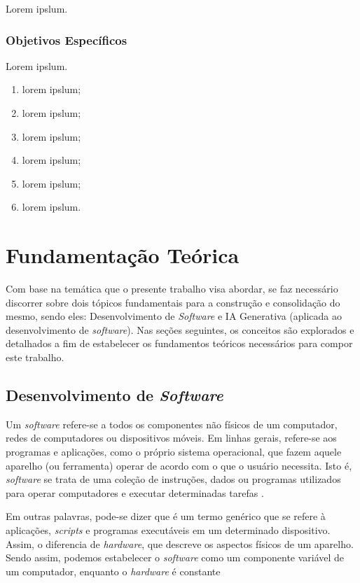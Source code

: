 \documentclass[english,brazilian]{UNISINOSartigo} %
\begin{document}
Lorem ipslum.

\subsubsection{Objetivos Específicos}

Lorem ipslum.
\begin{enumerate}[label=\alph*), leftmargin=1.2cm, itemsep=0.1em, topsep=0.1em]
    \item lorem ipslum;
    \item lorem ipslum;
    \item lorem ipslum;
    \item lorem ipslum;
    \item lorem ipslum;
    \item lorem ipslum.
\end{enumerate}

\section{Fundamentação Teórica}

Com base na temática que o presente trabalho visa abordar, se faz necessário discorrer sobre dois tópicos fundamentais para a construção e consolidação do mesmo, sendo eles: Desenvolvimento de \textit{Software} e IA Generativa (aplicada ao desenvolvimento de \textit{software}). Nas seções seguintes, os conceitos são explorados e detalhados a fim de estabelecer os fundamentos teóricos necessários para compor este trabalho.

\subsection{Desenvolvimento de \textit{Software}}

Um \textit{software} refere-se a todos os componentes não físicos de um computador, redes de computadores ou dispositivos móveis. Em linhas gerais, refere-se aos programas e aplicações, como o próprio sistema operacional, que fazem aquele aparelho (ou ferramenta) operar de acordo com o que o usuário necessita. Isto é, \textit{software} se trata de uma coleção de instruções, dados ou programas utilizados para operar computadores e executar determinadas tarefas \cite{coutinho2021}.

Em outras palavras, pode-se dizer que é um termo genérico que se refere à aplicações, \textit{scripts} e programas executáveis em um determinado dispositivo. Assim, o diferencia de \textit{hardware}, que descreve os aspectos físicos de um aparelho. Sendo assim, podemos estabelecer o \textit{software} como um componente variável de um computador, enquanto o \textit{hardware} é constante \cite{sakurai2018}
\end{document}
